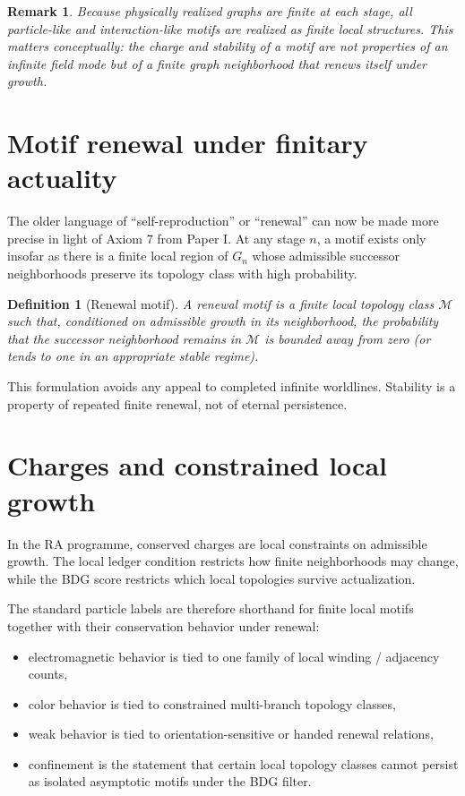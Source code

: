 \documentclass[11pt]{article}
\newtheorem{definition}{Definition}
\newtheorem{remark}{Remark}
\begin{document}
\begin{remark}
Because physically realized graphs are finite at each stage, all particle-like and interaction-like motifs are realized as finite local structures. This matters conceptually: the charge and stability of a motif are not properties of an infinite field mode but of a finite graph neighborhood that renews itself under growth.
\end{remark}

\section{Motif renewal under finitary actuality}
The older language of ``self-reproduction'' or ``renewal'' can now be made more precise in light of Axiom 7 from Paper I. At any stage $n$, a motif exists only insofar as there is a finite local region of $G_n$ whose admissible successor neighborhoods preserve its topology class with high probability.

\begin{definition}[Renewal motif]
A renewal motif is a finite local topology class $\mathcal{M}$ such that, conditioned on admissible growth in its neighborhood, the probability that the successor neighborhood remains in $\mathcal{M}$ is bounded away from zero (or tends to one in an appropriate stable regime).
\end{definition}

This formulation avoids any appeal to completed infinite worldlines. Stability is a property of repeated finite renewal, not of eternal persistence.

\section{Charges and constrained local growth}
In the RA programme, conserved charges are local constraints on admissible growth. The local ledger condition restricts how finite neighborhoods may change, while the BDG score restricts which local topologies survive actualization.

The standard particle labels are therefore shorthand for finite local motifs together with their conservation behavior under renewal:
\begin{itemize}
    \item electromagnetic behavior is tied to one family of local winding / adjacency counts,
    \item color behavior is tied to constrained multi-branch topology classes,
    \item weak behavior is tied to orientation-sensitive or handed renewal relations,
    \item confinement is the statement that certain local topology classes cannot persist as isolated asymptotic motifs under the BDG filter.
\end{itemize}
\end{document}
